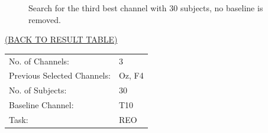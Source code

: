 \documentclass[oneside, a4paper,10pt]{report}
\begin{document}
\begin{figure}[H]
  \caption{Search for the third best channel with $30$ subjects, no baseline is removed.}
  \label{fg:3Ch_S30_B0}
\end{figure}


\newpage

\hspace*{12cm}\hyperlink{tab:TestResults}{(BACK TO RESULT TABLE)}

\bigskip
\bigskip

\begin{tabular}{ll}
  No. of Channels: & 3\\
  Previous Selected Channels: & Oz, F4\\
  No. of Subjects: & 30\\
  Baseline Channel: & T10\\
  Task:	& REO 
\end{tabular}

\bigskip
\end{document}

